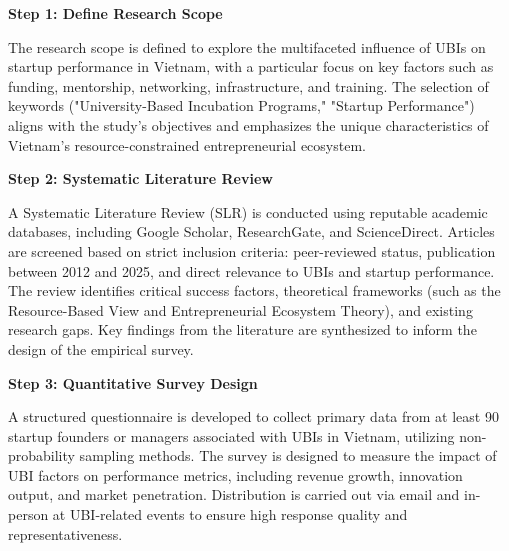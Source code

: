 \documentclass[../Main.tex]{subfiles}
\begin{document}
	\begin{center}
	\begin{minipage}[c]{0.6\textwidth}
		\vspace*{\fill}
	\textbf{Step 1: Define Research Scope}

	The research scope is defined to explore the multifaceted influence of UBIs on startup performance in Vietnam, with a particular focus on key factors such as funding, mentorship, networking, infrastructure, and training. The selection of keywords ("University-Based Incubation Programs," "Startup Performance") aligns with the study's objectives and emphasizes the unique characteristics of Vietnam's resource-constrained entrepreneurial ecosystem.

	\textbf{Step 2: Systematic Literature Review}

	A Systematic Literature Review (SLR) is conducted using reputable academic databases, including Google Scholar, ResearchGate, and ScienceDirect. Articles are screened based on strict inclusion criteria: peer-reviewed status, publication between 2012 and 2025, and direct relevance to UBIs and startup performance. The review identifies critical success factors, theoretical frameworks (such as the Resource-Based View and Entrepreneurial Ecosystem Theory), and existing research gaps. Key findings from the literature are synthesized to inform the design of the empirical survey.

	\textbf{Step 3: Quantitative Survey Design}

	A structured questionnaire is developed to collect primary data from at least 90 startup founders or managers associated with UBIs in Vietnam, utilizing non-probability sampling methods. The survey is designed to measure the impact of UBI factors on performance metrics, including revenue growth, innovation output, and market penetration. Distribution is carried out via email and in-person at UBI-related events to ensure high response quality and representativeness.


\end{minipage}
\end{center}
\end{document}
